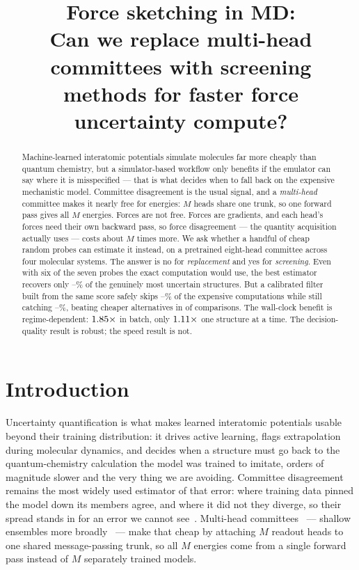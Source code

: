 \documentclass{article}
\title{Force sketching in MD:\\
Can we replace multi-head committees with screening\\
methods for faster force uncertainty compute?}
\author{}
\begin{document}
\maketitle

\begin{abstract}
Machine-learned interatomic potentials simulate molecules far more cheaply than quantum chemistry,
but a simulator-based workflow only benefits if the emulator can say where it is misspecified ---
that is what decides when to fall back on the expensive mechanistic model. Committee disagreement is the usual signal, and a
\emph{multi-head} committee makes it nearly free for energies: $M$ heads share one trunk, so one
forward pass gives all $M$ energies. Forces are not free. Forces are gradients, and each head's
forces need their own backward pass, so force disagreement --- the quantity acquisition actually
uses --- costs about $M$ times more. We ask whether a handful of cheap random probes can estimate it
instead, on a pretrained eight-head committee across four molecular systems. The answer is no for
\emph{replacement} and yes for \emph{screening}. Even with six of the seven probes the exact
computation would use, the best estimator recovers only
\fsMaxRecallKSixLoPct--\fsMaxRecallKSixHiPct\% of the genuinely most uncertain structures. But a
calibrated filter built from the same score safely skips
\fsGateCVSkipLoPct--\fsGateCVSkipHiPct\% of the expensive computations while still catching
\fsGateCVRecallLoPct--\fsGateCVRecallHiPct\%, beating cheaper alternatives in \fsGateCVDominates{} of
\fsGateCVComparisons{} comparisons. The wall-clock benefit is regime-dependent:
$1.85\times$ in batch, only $1.11\times$ one structure at a
time. The decision-quality result is robust; the speed result is not.
\end{abstract}

\section{Introduction}
Uncertainty quantification is what makes learned interatomic potentials usable beyond their training
distribution: it drives active learning, flags extrapolation during molecular dynamics, and decides
when a structure must go back to the quantum-chemistry calculation the model was trained to imitate,
orders of magnitude slower and the very thing we are avoiding. Committee disagreement remains the
most widely used estimator of that error: where training data pinned the model down its members
agree, and where it did not they diverge, so their spread stands in for an error we cannot
see~\citep{behler2015,podryabinkin2017,carrete2023}. Multi-head
committees~\citep{beck2025mhc} --- shallow ensembles more broadly~\citep{kellner2024} --- make that
cheap by attaching $M$ readout heads to one shared message-passing trunk, so all $M$ energies come
from a single forward pass instead of $M$ separately trained models.
\end{document}

